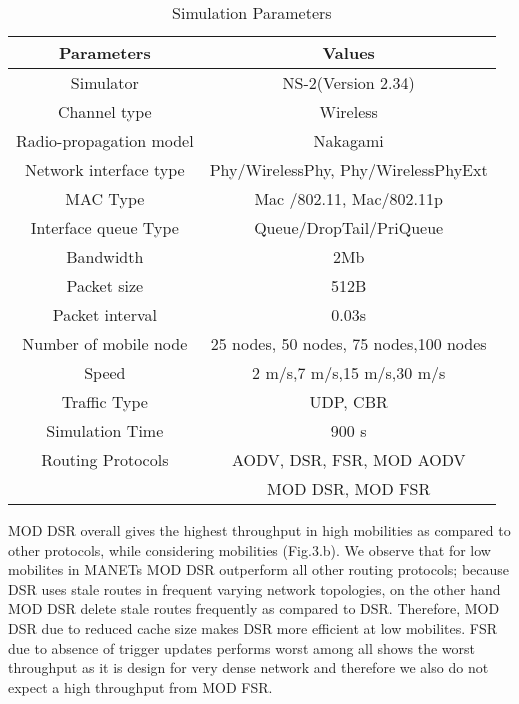 \documentclass[journal]{IEEEtran}
\begin{document}
\begin{table}[!h]
\caption {Simulation Parameters}
\begin {center}
\begin{tabular}{|c|c|}
\hline
\textbf{Parameters} & \textbf{Values}\\
\hline

Simulator & NS-2(Version 2.34)\\

\hline

Channel type & Wireless  \\
\hline

Radio-propagation model  & Nakagami  \\
\hline

Network interface type & Phy/WirelessPhy, Phy/WirelessPhyExt  \\
 \hline

MAC Type  &Mac /802.11, Mac/802.11p  \\

\hline
Interface queue Type & Queue/DropTail/PriQueue \\
\hline

Bandwidth & 2Mb \\
\hline

Packet size & 512B  \\

\hline

Packet interval & 0.03s\\
\hline

 Number of mobile node & 25 nodes, 50 nodes, 75 nodes,100 nodes \\
\hline

Speed & 2 m/s,7 m/s,15 m/s,30 m/s\\
\hline

Traffic Type & UDP, CBR \\
\hline

Simulation Time & 900 s \\
\hline

Routing Protocols & AODV, DSR, FSR,  MOD AODV  \\
&  MOD DSR, MOD FSR \\
\hline
\end{tabular}
\end{center}
\end{table}


MOD DSR overall gives the highest throughput in high mobilities as compared to other protocols, while considering mobilities (Fig.3.b).
We observe that for low mobilites in MANETs MOD DSR outperform all other routing protocols; because DSR uses stale routes in frequent varying network topologies, on the other hand MOD DSR delete stale routes frequently as compared to DSR.
Therefore, MOD DSR due to reduced cache size makes DSR more efficient at low mobilites.
FSR due to absence of trigger updates performs worst among all shows the worst throughput as it is design for very dense network and therefore we also do not expect a high throughput from MOD FSR.
\end{document}

